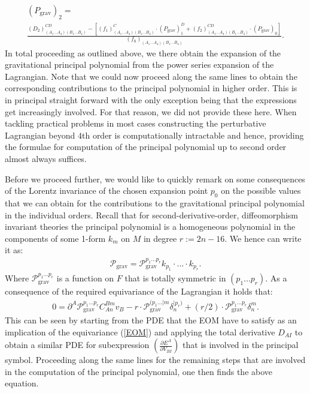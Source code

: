 \begin{multline}\label{POLY3}
    (P_{\text{grav}})_2 = \\
    \frac{(D_2)^{CD}_{(A_1...A_4)(B_1...B_4)}-\left [ (f_1)^C_{(A_1...A_4)(B_1...B_4)} \cdot (P_{\text{grav}})^D_1  +(f_2)^{CD}_{(A_1...A_4)(B_1...B_4)} \cdot (P_{\text{grav}})_0 \right ]}{(f_0)_{(A_1...A_4)(B_1...B_4)}}.
\end{multline}
In total proceeding as outlined above, we there obtain the expansion of the gravitational principal polynomial from the power series expansion of the Lagrangian.
Note that we could now proceed along the same lines to obtain the corresponding contributions to the principal polynomial in higher order. This is in principal straight forward with the only exception being that the expressions get increasingly involved. For that reason, we did not provide these here. When tackling practical problems in most cases constructing the perturbative Lagrangian beyond $4$th order is computationally intractable and hence, providing the formulae for computation of the principal polynomial up to second order almost always suffices.

Before we proceed further, we would like to quickly remark on some consequences of the Lorentz invariance of the chosen expansion point $p_0$ on the possible values that we can obtain for the contributions to the gravitational principal polynomial in the individual orders. Recall that for second-derivative-order, diffeomorphism invariant theories the principal polynomial is a homogeneous polynomial in the components of some 1-form $k_m$ on $M$ in degree $r := 2n-16$. We hence can write it as:
\begin{align}
    \mathcal{P}_{\text{grav}} = \mathcal{P}_{\text{grav}}^{{p_1}...{p_{r}}} k_{p_1} \cdot ... \cdot k_{p_r}.
\end{align}
Where $\mathcal{P}_{\text{grav}}^{{p_1}...{p_r}}$ is a function on $F$ that is totally symmetric in $(p_1...p_r)$. As a consequence of the required equivariance of the Lagrangian it holds that:
\begin{align}\label{polyEqn}
    0 = \partial^A\mathcal{P}_{\text{grav}}^{{p_1}...{p_r}}C_{An}^{Bm}v_B - r \cdot \mathcal{P}_{\text{grav}}^{({p_1}...\vert m} \delta_{n}^{\vert p_r) }  + (r/2) \cdot \mathcal{P}_{\text{grav}}^{{p_1}...{p_r}} \delta^m_n.
\end{align}
%
%
%
This can be seen by starting from the PDE that the EOM have to satisfy as an implication of the equivariance (\ref{EOM}) and applying the total derivative $D_{AI}$ to obtain a similar PDE for subexpression $\left ( \frac{\partial E^A}{\partial V_{BI}} \right )$ that is involved in the principal symbol. Proceeding along the same lines for the remaining steps that are involved in the computation of the principal polynomial, one then finds the above equation. 

